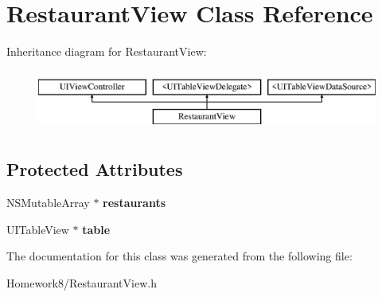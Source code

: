 \hypertarget{interface_restaurant_view}{}\section{Restaurant\+View Class Reference}
\label{interface_restaurant_view}
Inheritance diagram for Restaurant\+View\+:\begin{figure}[H]
\begin{center}
\leavevmode
\includegraphics[height=2.000000cm]{interface_restaurant_view}
\end{center}
\end{figure}
\subsection*{Protected Attributes}
\begin{DoxyCompactItemize}
\item 
\mbox{\label{interface_restaurant_view_a651ab7f6723ad88045d6a83026c3f8f2}} 
N\+S\+Mutable\+Array $\ast$ {\bfseries restaurants}
\item 
\mbox{\label{interface_restaurant_view_afab1648b171ef7a86be28bbaca91f0f8}} 
U\+I\+Table\+View $\ast$ {\bfseries table}
\end{DoxyCompactItemize}


The documentation for this class was generated from the following file\+:\begin{DoxyCompactItemize}
\item 
Homework8/Restaurant\+View.\+h\end{DoxyCompactItemize}
